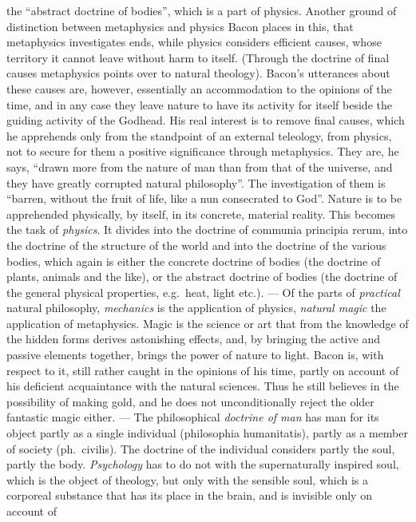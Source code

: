 the ``abstract doctrine of bodies'', which is a part of physics. Another ground of distinction between metaphysics and
physics Bacon places in this, that metaphysics investigates ends, while physics considers efficient causes,
whose territory it cannot leave without harm to itself. (Through
the doctrine of final causes metaphysics points over to
natural theology). Bacon's utterances about these causes are,
however, essentially an accommodation to the opinions of the time,
and in any case they leave nature to have its activity
for itself beside the guiding activity of the Godhead. His
real interest is to remove final causes, which he
apprehends only from the standpoint of an external teleology, from physics,
not to secure for them a positive significance through metaphysics. They are, he says, ``drawn more from the nature of man
than from that of the universe, and they have greatly corrupted natural philosophy''. The investigation of them is ``barren, without the fruit of life, like a nun consecrated to God''. Nature is to be apprehended
physically, by itself, in its concrete, material reality.
This becomes the task of \emph{physics}. It divides into the doctrine of
communia principia rerum, into the doctrine of the structure of the world and
into the doctrine of the various bodies, which again is either the
concrete doctrine of bodies (the doctrine of plants, animals and the like), or the
abstract doctrine of bodies (the doctrine of the general physical properties, e.g.\ heat, light etc.). --- Of the parts of \emph{practical} natural philosophy, \emph{mechanics} is the application of physics,
\emph{natural magic} the application of metaphysics. Magic is the science or art that from the knowledge of the
hidden forms derives astonishing effects, and, by bringing
the active and passive elements together, brings the power of nature
to light. Bacon is, with respect to it, still rather caught
in the opinions of his time, partly on account of his deficient acquaintance with the natural sciences. Thus he still believes in the possibility of making gold, and he does not unconditionally reject the older fantastic magic either. --- The philosophical \emph{doctrine
of man} has man for its object partly as a single
individual (philosophia humanitatis), partly as a member of society
(ph.\ civilis). The doctrine of the individual considers partly the soul, partly
the body. \emph{Psychology} has to do not with the supernaturally inspired soul, which is the object of theology, but
only with the sensible soul, which is a corporeal substance
that has its place in the brain, and is invisible only on account of

